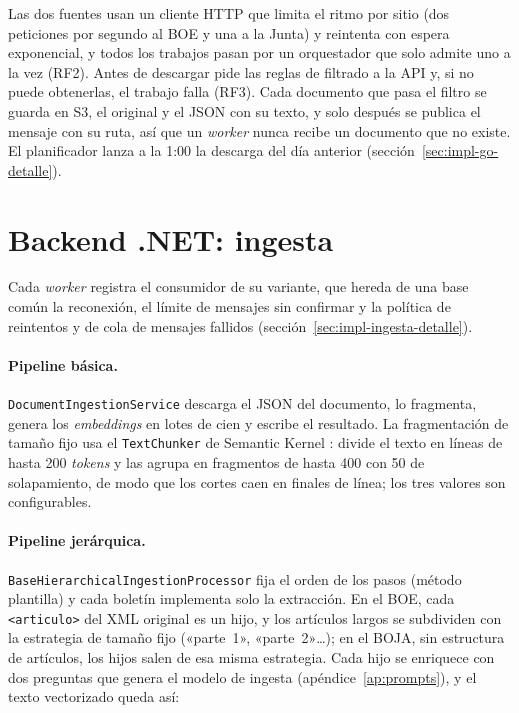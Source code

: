 Las dos fuentes usan un cliente HTTP que limita el ritmo por sitio (dos peticiones por segundo al BOE y una a la Junta) y reintenta con espera exponencial, y todos los trabajos pasan por un orquestador que solo admite uno a la vez (RF2). Antes de descargar pide las reglas de filtrado a la API y, si no puede obtenerlas, el trabajo falla (RF3). Cada documento que pasa el filtro se guarda en S3, el original y el JSON con su texto, y solo después se publica el mensaje con su ruta, así que un \emph{worker} nunca recibe un documento que no existe. El planificador lanza a la 1:00 la descarga del día anterior (sección~\ref{sec:impl-go-detalle}).

\section{Backend .NET: ingesta}
\label{sec:impl-ingesta}

Cada \emph{worker} registra el consumidor de su variante, que hereda de una base común la reconexión, el límite de mensajes sin confirmar y la política de reintentos y de cola de mensajes fallidos (sección~\ref{sec:impl-ingesta-detalle}).

\paragraph{Pipeline básica.} \texttt{DocumentIngestionService} descarga el JSON del documento, lo fragmenta, genera los \emph{embeddings} en lotes de cien y escribe el resultado. La fragmentación de tamaño fijo usa el \texttt{TextChunker} de Semantic Kernel \cite{semantickernel}: divide el texto en líneas de hasta 200 \emph{tokens} y las agrupa en fragmentos de hasta 400 con 50 de solapamiento, de modo que los cortes caen en finales de línea; los tres valores son configurables.

\paragraph{Pipeline jerárquica.} \texttt{Base\-Hierarchical\-Ingestion\-Processor} fija el orden de los pasos (método plantilla) y cada boletín implementa solo la extracción. En el BOE, cada \texttt{<articulo>} del XML original es un hijo, y los artículos largos se subdividen con la estrategia de tamaño fijo («parte~1», «parte~2»…); en el BOJA, sin estructura de artículos, los hijos salen de esa misma estrategia. Cada hijo se enriquece con dos preguntas que genera el modelo de ingesta (apéndice~\ref{ap:prompts}), y el texto vectorizado queda así:

